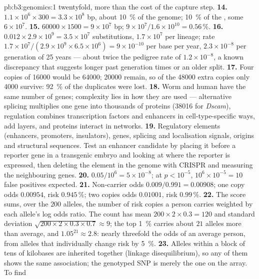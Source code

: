 \begin{solution}{pb:b3:genomics:1}
twentyfold, more than the cost of the capture step.
\textbf{14.} $1.1\times 10^{6}\times 300 = 3.3\times 10^{8}$ bp, about
\qty{10}{\%} of the genome; \qty{10}{\%} of the , some $6\times
10^{7}$.
\textbf{15.} $\num{60000}\times 1500 = 9\times 10^{7}$ bp; $9\times
10^{7}/1.6\times 10^{10} = 0.56\,\%$.
\textbf{16.} $0.012\times 2.9\times 10^{9} = 3.5\times 10^{7}$
substitutions, $1.7\times 10^{7}$ per lineage; rate $1.7\times
10^{7}/(2.9\times 10^{9}\times 6.5\times 10^{6}) = 9\times 10^{-10}$
per base per year, $2.3\times 10^{-8}$ per generation of 25 years ---
about twice the pedigree rate of $1.2\times 10^{-8}$, a known
discrepancy that suggests longer past generation times or an older
split.
\textbf{17.} Four copies of \num{16000} would be \num{64000}; \num{20000}
remain, so of the \num{48000} extra copies only \num{4000} survive:
\qty{92}{\%} of the duplicates were lost.
\textbf{18.} Worm and human have the same number of genes; complexity
lies in how they are used --- alternative splicing multiplies one gene
into thousands of proteins (\num{38016} for \emph{Dscam}), regulation
combines transcription factors and enhancers in cell-type-specific
ways,  add layers, and proteins interact in networks.
\textbf{19.} Regulatory elements (enhancers, promoters, insulators),
 genes, splicing and localisation signals, origins and
structural sequences. Test an enhancer candidate by placing it before
a reporter gene in a transgenic embryo and looking at where the
reporter is expressed, then deleting the element in the genome with
CRISPR and measuring the neighbouring genes.
\textbf{20.} $0.05/10^{6} = 5\times 10^{-8}$; at $p < 10^{-5}$, $10^{6}
\times 10^{-5} = 10$ false positives expected.
\textbf{21.} Non-carrier odds $0.009/0.991 = 0.00908$; one copy odds
$0.00954$, risk $0.945\,\%$; two copies odds $0.01001$, risk
$0.99\,\%$.
\textbf{22.} The score sums, over the $200$ alleles, the number of risk
copies a person carries weighted by each allele's log odds ratio. The
count has mean $200\times 2\times 0.3 = 120$ and standard deviation
$\sqrt{200\times 2\times 0.3\times 0.7} \approx 9$; the top \qty{1}{\%}
carries about $21$ alleles more than average, and $1.05^{21} \approx
2.8$: nearly threefold the odds of an average person, from alleles
that individually change risk by \qty{5}{\%}.
\textbf{23.} Alleles within a block of tens of kilobases are inherited
together (linkage disequilibrium), so any of them shows the same
association; the genotyped SNP is merely the one on the array. To find

\end{solution}
